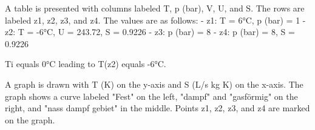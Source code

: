 A table is presented with columns labeled T, p (bar), V, U, and S. The rows are labeled z1, z2, z3, and z4. The values are as follows:
- z1: T = 6°C, p (bar) = 1
- z2: T = -6°C, U = 243.72, S = 0.9226
- z3: p (bar) = 8
- z4: p (bar) = 8, S = 0.9226

Ti equals 0°C leading to T(z2) equals -6°C.

A graph is drawn with T (K) on the y-axis and S (L/s kg K) on the x-axis. The graph shows a curve labeled "Fest" on the left, "dampf" and "gasförmig" on the right, and "nass dampf gebiet" in the middle. Points z1, z2, z3, and z4 are marked on the graph.
